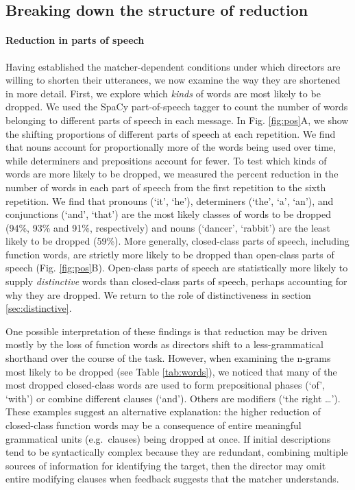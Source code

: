 \documentclass[alpha-refs]{wiley-article}
\begin{document}
\subsection{Breaking down the structure of reduction}\label{reduction}

\paragraph{Reduction in parts of speech}

Having established the matcher-dependent conditions under which directors are willing to shorten their utterances, we now examine the way they are shortened in more detail.
First, we explore which \emph{kinds} of words are most likely to be dropped. 
We used the SpaCy part-of-speech tagger \citep{spacy2} to count the number of words belonging to different parts of speech in each message.
In Fig. \ref{fig:pos}A, we show the shifting proportions of different parts of speech at each repetition.
We find that nouns account for proportionally more of the words being used over time, while determiners and prepositions account for fewer.
To test which kinds of words are more likely to be dropped, we measured the percent reduction in the number of words in each part of speech from the first repetition to the sixth repetition. 
We find that pronouns (`it', `he'), determiners (`the', `a', `an'), and conjunctions (`and', `that') are the most likely classes of words to be dropped (94\%, 93\% and 91\%, respectively) and nouns (`dancer', `rabbit') are the least likely to be dropped (59\%).
More generally, closed-class parts of speech, including function words, are strictly more likely to be dropped than open-class parts of speech (Fig. \ref{fig:pos}B).
Open-class parts of speech are statistically more likely to supply \emph{distinctive} words than closed-class parts of speech, perhaps accounting for why they are dropped. 
We return to the role of distinctiveness in section \ref{sec:distinctive}.

One possible interpretation of these findings is that reduction may be driven mostly by the loss of function words as directors shift to a less-grammatical shorthand over the course of the task.
However, when examining the n-grams most likely to be dropped (see Table \ref{tab:words}), we noticed that many of the most dropped closed-class words are used to  form prepositional phases (`of', `with') or combine different clauses (`and'). 
Others are modifiers (`the right \dots'). 
These examples suggest an alternative explanation: the higher reduction of closed-class function words may be a consequence of entire meaningful grammatical units (e.g.~clauses) being dropped at once.
If initial descriptions tend to be syntactically complex because they are redundant, combining multiple sources of information for identifying the target, then the director may omit entire modifying clauses when feedback suggests that the matcher understands.
\end{document}
